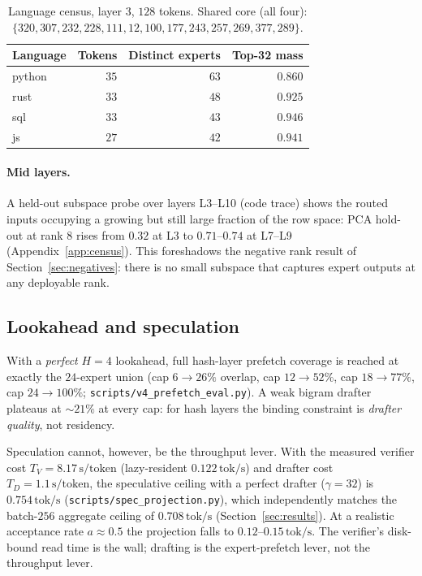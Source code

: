\documentclass[11pt]{article}
\newcommand{\code}[1]{\texttt{#1}}
\newcommand{\tps}{\,\textrm{tok/s}}
\begin{document}
\begin{table}[t]
\centering
\small
\begin{tabular}{lrrr}
\toprule
\textbf{Language} & \textbf{Tokens} & \textbf{Distinct experts} & \textbf{Top-32 mass} \\
\midrule
python & $35$ & $63$ & $0.860$ \\
rust   & $33$ & $48$ & $0.925$ \\
sql    & $33$ & $43$ & $0.946$ \\
js     & $27$ & $42$ & $0.941$ \\
\bottomrule
\end{tabular}
\caption{Language census, layer $3$, $128$ tokens. Shared core (all four):
$\{320,307,232,228,111,12,100,177,243,257,269,377,289\}$.}
\label{tab:langcensus}
\end{table}

\paragraph{Mid layers.}
A held-out subspace probe over layers L3--L10 (code trace) shows the routed
inputs occupying a growing but still large fraction of the row space: PCA
hold-out at rank $8$ rises from $0.32$ at L3 to $0.71$--$0.74$ at L7--L9
(Appendix~\ref{app:census}). This foreshadows the negative rank result of
Section~\ref{sec:negatives}: there is no small subspace that captures expert
outputs at any deployable rank.

\subsection{Lookahead and speculation}
\label{sec:spec}

With a \emph{perfect} $H{=}4$ lookahead, full hash-layer prefetch coverage is
reached at exactly the $24$-expert union (cap $6\to26\%$ overlap, cap
$12\to52\%$, cap $18\to77\%$, cap $24\to100\%$; \code{scripts/v4\_prefetch\_eval.py}).
A weak bigram drafter plateaus at ${\sim}21\%$ at every cap: for hash layers the
binding constraint is \emph{drafter quality}, not residency.

Speculation cannot, however, be the throughput lever. With the measured verifier
cost $T_V=8.17\,\textrm{s/token}$ (lazy-resident $0.122\tps{}$) and drafter cost
$T_D=1.1\,\textrm{s/token}$, the speculative ceiling with a perfect drafter
($\gamma{=}32$) is $0.754\tps{}$ (\code{scripts/spec\_projection.py}), which
independently matches the batch-$256$ aggregate ceiling of $0.708\tps{}$
(Section~\ref{sec:results}). At a realistic acceptance rate $a\approx0.5$ the
projection falls to $0.12$--$0.15\tps{}$. The verifier's disk-bound read time
is the wall; drafting is the expert-prefetch lever, not the throughput lever.
\end{document}
